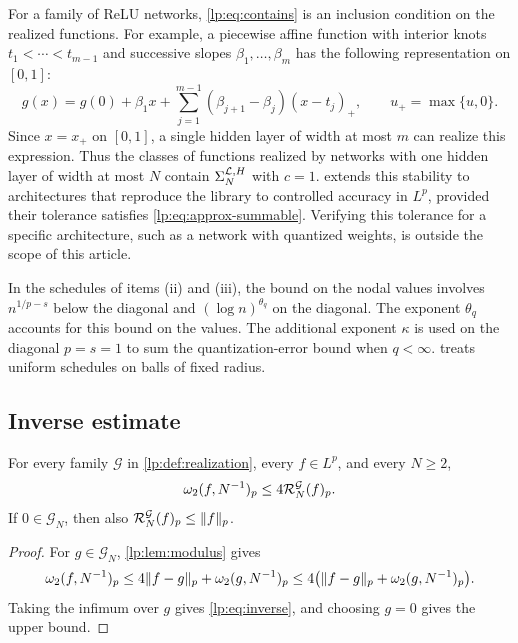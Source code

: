 \documentclass[11pt,a4paper]{article}
\begin{document}
For a family of ReLU networks, \eqref{lp:eq:contains} is an inclusion condition on the realized functions. For example, a piecewise affine function with interior knots $t_1<\cdots<t_{m-1}$ and successive slopes $\beta_1,\ldots,\beta_m$ has the following representation on $[0,1]$:
\[
 g(x)=g(0)+\beta_1 x+\sum_{j=1}^{m-1}(\beta_{j+1}-\beta_j)(x-t_j)_+,
 \qquad u_+=\max\{u,0\}.
\]
Since $x=x_+$ on $[0,1]$, a single hidden layer of width at most $m$ can realize this expression. Thus the classes of functions realized by networks with one hidden layer of width at most $N$ contain $\Sigma_{N}^{\mathcal L,H}$ with $c=1$.  extends this stability to architectures that reproduce the library to controlled accuracy in $L^p$, provided their tolerance satisfies \eqref{lp:eq:approx-summable}. Verifying this tolerance for a specific architecture, such as a network with quantized weights, is outside the scope of this article.

In the schedules of items (ii) and (iii), the bound on the nodal values involves $n^{1/p-s}$ below the diagonal and $(\log n)^{\theta_q}$ on the diagonal. The exponent $\theta_q$ accounts for this bound on the values. The additional exponent $\kappa$ is used on the diagonal $p=s=1$ to sum the quantization-error bound when $q<\infty$.  treats uniform schedules on balls of fixed radius.

\subsection{Inverse estimate}

\label{lp:sec:proved}

\begin{proposicao}
\label{lp:prop:inverse}
For every family $\mathcal G$ in \cref{lp:def:realization}, every $f\in L^p$, and every $N\ge2$,
\begin{equation}
 \omega_2(f,N^{-1})_{p}\le4\mathcal R^{\mathcal G}_{N}(f)_p.
 \label{lp:eq:inverse}
\end{equation}
If $0\in\mathcal G_N$, then also $\mathcal R^{\mathcal G}_{N}(f)_p\le\|f\|_p$.
\end{proposicao}

\begin{proof}
For $g\in\mathcal G_N$, \cref{lp:lem:modulus} gives
\[
 \omega_2(f,N^{-1})_{p}
 \le4\|f-g\|_p+\omega_2(g,N^{-1})_{p}
 \le4\bigl(\|f-g\|_p+\omega_2(g,N^{-1})_{p}\bigr).
\]
Taking the infimum over $g$ gives \eqref{lp:eq:inverse}, and choosing $g=0$ gives the upper bound.
\end{proof}
\end{document}
